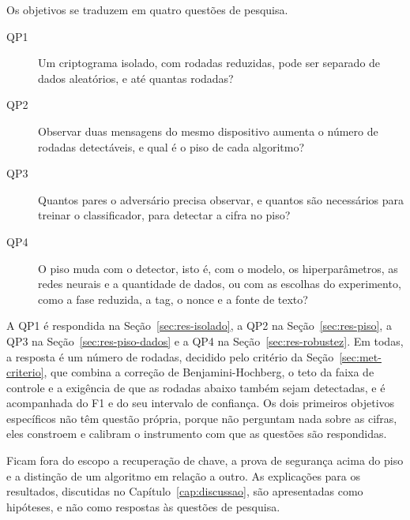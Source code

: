 Os objetivos se traduzem em quatro questões de pesquisa.
\begin{description}
\item[QP1] Um criptograma isolado, com rodadas reduzidas, pode ser separado de dados aleatórios, e até quantas rodadas?
\item[QP2] Observar duas mensagens do mesmo dispositivo aumenta o número de rodadas detectáveis, e qual é o piso de cada algoritmo?
\item[QP3] Quantos pares o adversário precisa observar, e quantos são necessários para treinar o classificador, para detectar a cifra no piso?
\item[QP4] O piso muda com o detector, isto é, com o modelo, os hiperparâmetros, as redes neurais e a quantidade de dados, ou com as escolhas do experimento, como a fase reduzida, a tag, o nonce e a fonte de texto?
\end{description}

A QP1 é respondida na Seção~\ref{sec:res-isolado}, a QP2 na Seção~\ref{sec:res-piso}, a QP3 na Seção~\ref{sec:res-piso-dados} e a QP4 na Seção~\ref{sec:res-robustez}. Em todas, a resposta é um número de rodadas, decidido pelo critério da Seção~\ref{sec:met-criterio}, que combina a correção de Benjamini-Hochberg, o teto da faixa de controle e a exigência de que as rodadas abaixo também sejam detectadas, e é acompanhada do F1 e do seu intervalo de confiança. Os dois primeiros objetivos específicos não têm questão própria, porque não perguntam nada sobre as cifras, eles constroem e calibram o instrumento com que as questões são respondidas.

Ficam fora do escopo a recuperação de chave, a prova de segurança acima do piso e a distinção de um algoritmo em relação a outro. As explicações para os resultados, discutidas no Capítulo~\ref{cap:discussao}, são apresentadas como hipóteses, e não como respostas às questões de pesquisa.
